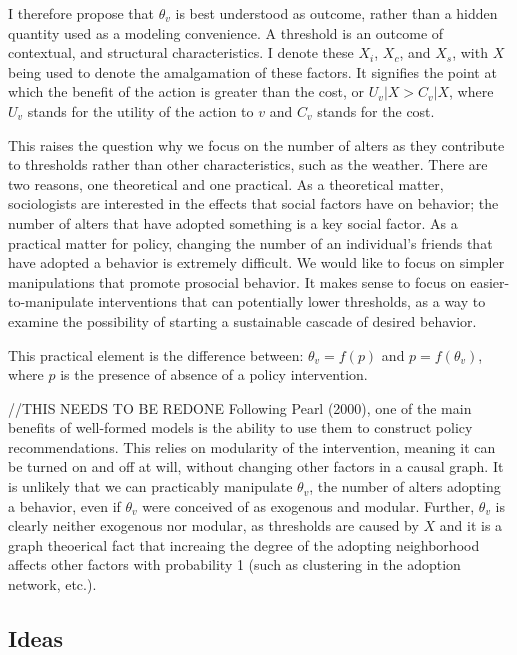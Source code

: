\documentclass{article}
\begin{document}
I therefore propose that $\theta_v$ is best understood as outcome, rather than a hidden quantity used as a modeling convenience. A threshold is an outcome of contextual, and structural characteristics. I denote these $X_i$, $X_c$, and $X_s$, with $X$ being used to denote the amalgamation of these factors. It signifies the point at which the benefit of the action is greater than the cost, or $U_v|X > C_v|X$, where $U_v$ stands for the utility of the action to $v$ and $C_v$ stands for the cost.

This raises the question why we focus on the number of alters as they contribute to thresholds rather than other characteristics, such as the weather. There are two reasons, one theoretical and one practical. As a theoretical matter, sociologists are interested in the effects that social factors have on behavior; the number of alters that have adopted something is a key social factor. As a practical matter for policy, changing the number of an individual's friends that have adopted a behavior is extremely difficult. We would like to focus on simpler manipulations that promote prosocial behavior. It makes sense to focus on easier-to-manipulate interventions that can potentially lower thresholds, as a way to examine the possibility of starting a sustainable cascade of desired behavior. 

This practical element is the difference between:
$\theta_v = f(p)$ and $p = f(\theta_v)$, where $p$ is the presence of absence of a policy intervention.


//THIS NEEDS TO BE REDONE
Following Pearl (2000), one of the main benefits of well-formed models is the ability to use them to construct policy recommendations. This relies on modularity of the intervention, meaning it can be turned on and off at will, without changing other factors in a causal graph. It is unlikely that we can practicably manipulate $\theta_v$, the number of alters adopting a behavior, even if $\theta_v$ were conceived of as exogenous and modular. Further, $\theta_v$ is clearly neither exogenous nor modular, as thresholds are caused by $X$ and it is a graph theoerical fact that increaing the degree of the adopting neighborhood affects other factors with probability 1 (such as clustering in the adoption network, etc.).







\subsection{Ideas}
\end{document}
